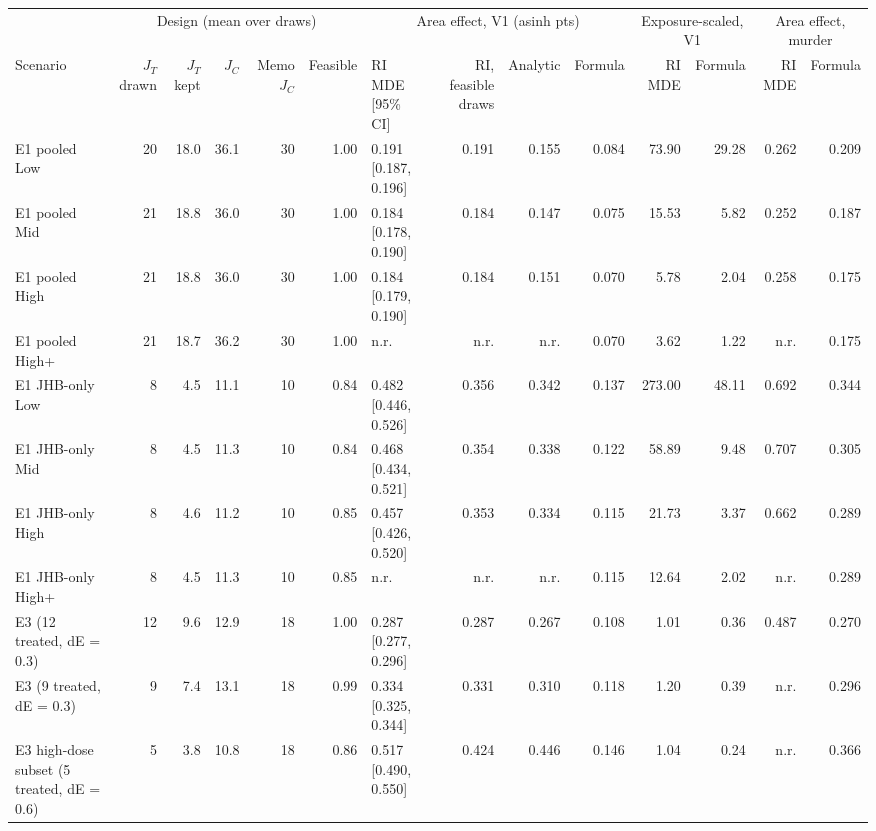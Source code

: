 \begin{tabular}{lrrrrrlrrrrrrr}
\toprule
 & \multicolumn{5}{c}{Design (mean over draws)} & \multicolumn{4}{c}{Area effect, V1 (asinh pts)} & \multicolumn{2}{c}{Exposure-scaled, V1} & \multicolumn{2}{c}{Area effect, murder} \\
\cmidrule(lr){2-6}\cmidrule(lr){7-10}\cmidrule(lr){11-12}\cmidrule(lr){13-14}
Scenario & $J_T$ drawn & $J_T$ kept & $J_C$ & Memo $J_C$ & Feasible & RI MDE [95\% CI] & RI, feasible draws & Analytic & Formula & RI MDE & Formula & RI MDE & Formula \\
\midrule
E1 pooled Low & 20 & 18.0 & 36.1 & 30 & 1.00 & 0.191 [0.187, 0.196] & 0.191 & 0.155 & 0.084 & 73.90 & 29.28 & 0.262 & 0.209 \\
E1 pooled Mid & 21 & 18.8 & 36.0 & 30 & 1.00 & 0.184 [0.178, 0.190] & 0.184 & 0.147 & 0.075 & 15.53 & 5.82 & 0.252 & 0.187 \\
E1 pooled High & 21 & 18.8 & 36.0 & 30 & 1.00 & 0.184 [0.179, 0.190] & 0.184 & 0.151 & 0.070 & 5.78 & 2.04 & 0.258 & 0.175 \\
E1 pooled High+ & 21 & 18.7 & 36.2 & 30 & 1.00 & n.r. & n.r. & n.r. & 0.070 & 3.62 & 1.22 & n.r. & 0.175 \\
E1 JHB-only Low & 8 & 4.5 & 11.1 & 10 & 0.84 & 0.482 [0.446, 0.526] & 0.356 & 0.342 & 0.137 & 273.00 & 48.11 & 0.692 & 0.344 \\
E1 JHB-only Mid & 8 & 4.5 & 11.3 & 10 & 0.84 & 0.468 [0.434, 0.521] & 0.354 & 0.338 & 0.122 & 58.89 & 9.48 & 0.707 & 0.305 \\
E1 JHB-only High & 8 & 4.6 & 11.2 & 10 & 0.85 & 0.457 [0.426, 0.520] & 0.353 & 0.334 & 0.115 & 21.73 & 3.37 & 0.662 & 0.289 \\
E1 JHB-only High+ & 8 & 4.5 & 11.3 & 10 & 0.85 & n.r. & n.r. & n.r. & 0.115 & 12.64 & 2.02 & n.r. & 0.289 \\
E3 (12 treated, dE = 0.3) & 12 & 9.6 & 12.9 & 18 & 1.00 & 0.287 [0.277, 0.296] & 0.287 & 0.267 & 0.108 & 1.01 & 0.36 & 0.487 & 0.270 \\
E3 (9 treated, dE = 0.3) & 9 & 7.4 & 13.1 & 18 & 0.99 & 0.334 [0.325, 0.344] & 0.331 & 0.310 & 0.118 & 1.20 & 0.39 & n.r. & 0.296 \\
E3 high-dose subset (5 treated, dE = 0.6) & 5 & 3.8 & 10.8 & 18 & 0.86 & 0.517 [0.490, 0.550] & 0.424 & 0.446 & 0.146 & 1.04 & 0.24 & n.r. & 0.366 \\
\bottomrule
\end{tabular}
